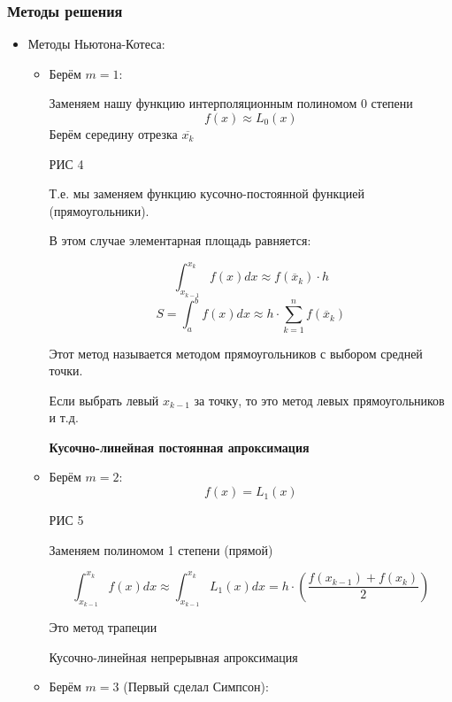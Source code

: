 \documentclass[12pt]{article}
\begin{document}
\subsubsection{Методы решения}
\begin{itemize}
  \item Методы Ньютона-Котеса:
        \begin{itemize}
          \item Берём \( m=1 \):

                Заменяем нашу функцию интерполяционным полиномом 0 степени
                \[
                    f(x) \approx L_0(x)         
                \] 
                Берём середину отрезка \( \overline{x_k} \)

                РИС 4

                Т.е. мы заменяем функцию кусочно-постоянной функцией
                (прямоугольники).

                В этом случае элементарная площадь равняется:

                \[
                  \int_{x_{k-1}}^{x_k} f(x)dx \approx
                  f(\overline{x}_k) \cdot h
                \] 
                \[
                  S = \int_{a}^{b} f(x)dx \approx
                  h \cdot \sum_{k=1}^{n}f(\overline{x}_k)
                \] 

                Этот метод называется методом прямоугольников
                с выбором средней точки.  

                Если выбрать левый \( x_{k-1} \) за точку, то это метод
                левых прямоугольников и т.д.

                \textbf{Кусочно-линейная постоянная апроксимация}
          \item Берём \( m=2 \):
            \[
              f(x) = L_1(x)
            \] 

            РИС 5

            Заменяем полиномом 1 степени (прямой)

            \[
              \int_{x_{k-1}}^{x_k} f(x)dx \approx
              \int_{x_{k-1}}^{x_k} L_1(x)dx =
              h \cdot \left( \frac{f(x_{k-1}) + f(x_k)}{2} \right)
            \] 

            Это метод трапеции

            Кусочно-линейная непрерывная апроксимация

          \item Берём \( m=3 \) (Первый сделал Симпсон):


\end{itemize}
\end{itemize}
\end{document}
